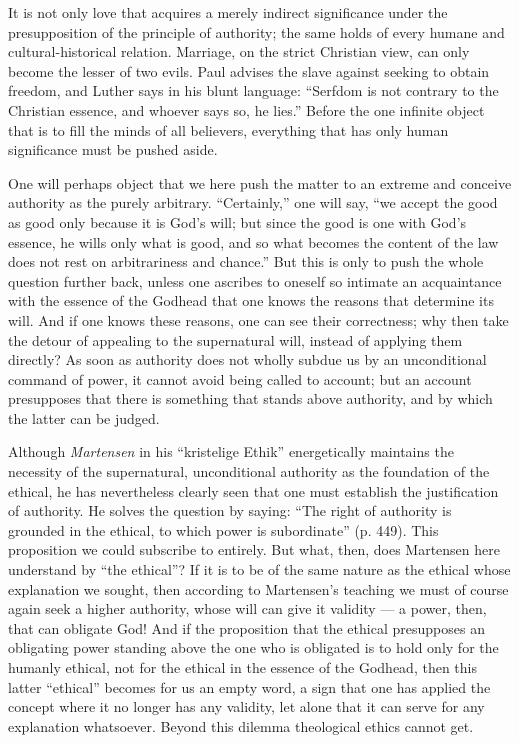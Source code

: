 \documentclass[12pt,a4paper,openany]{book}
\newcommand{\opage}[1]{\marginnote{\footnotesize\textit{[#1]}}}
\begin{document}
It is not only love that acquires a merely indirect significance under the
presupposition of the principle of authority; the same holds of every humane
and cultural-historical relation. Marriage, on the strict Christian view, can
only become the lesser of two evils. Paul advises the slave against seeking to
obtain freedom, and Luther says in his blunt language: ``Serfdom is not
contrary to the Christian essence, and whoever says so, he lies.'' Before the
one infinite object that is to fill the minds of all believers, everything
that has only human significance must be pushed aside.

One will perhaps object that we here push the \opage{72}matter to an extreme
and conceive authority as the purely arbitrary. ``Certainly,'' one will say,
``we accept the good as good only because it is God's will; but since the good
is one with God's essence, he wills only what is good, and so what becomes the
content of the law does not rest on arbitrariness and chance.'' But this is
only to push the whole question further back, unless one ascribes to oneself
so intimate an acquaintance with the essence of the Godhead that one knows the
reasons that determine its will. And if one knows these reasons, one can see
their correctness; why then take the detour of appealing to the supernatural
will, instead of applying them directly? As soon as authority does not wholly
subdue us by an unconditional command of power, it cannot avoid being called
to account; but an account presupposes that there is something that stands
above authority, and by which the latter can be judged.

Although \emph{Martensen} in his ``kristelige Ethik'' %
energetically maintains the necessity of the supernatural, unconditional
authority as the foundation of the ethical, he has nevertheless clearly seen
that one must establish the justification of authority. He solves the question
by saying: ``The right of authority is grounded in the ethical, to which power
is subordinate'' (p. 449). This proposition we could subscribe to entirely.
But what, then, does Martensen here understand by ``the ethical''? If it is to
be of the same nature as the ethical whose explanation we sought, then
according to Martensen's teaching we must of course again seek a higher
authority, whose will \opage{73}can give it validity --- a power, then, that
can obligate God! And if the proposition that the ethical presupposes an
obligating power standing above the one who is obligated is to hold only for
the humanly ethical, not for the ethical in the essence of the Godhead, then
this latter ``ethical'' becomes for us an empty word, a sign that one has
applied the concept where it no longer has any validity, let alone that it can
serve for any explanation whatsoever. Beyond this dilemma theological ethics
cannot get.
\end{document}
